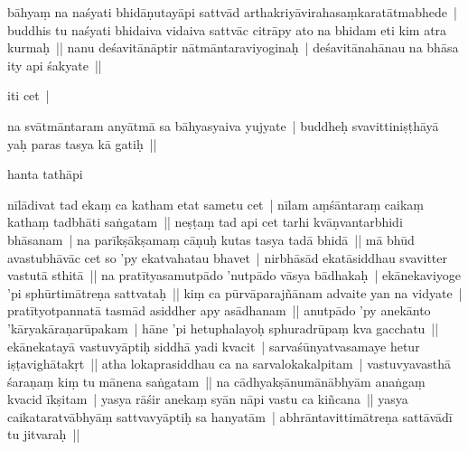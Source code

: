 \documentclass[article,12pt,a4paper]{memoir}%
\newcounter{parCount}
\begin{document}
	  \pstart \leavevmode%
	bāhyaṃ na naśyati bhidāṇutayāpi sattvād arthakriyāvirahasaṃkaratātmabhede | buddhis tu naśyati bhidaiva vidaiva sattvāc citrāpy ato na bhidam eti kim atra kurmaḥ ||  nanu deśavitānāptir nātmāntaraviyoginaḥ | deśavitānahānau na bhāsa ity api śakyate ||
	{}
	\pend%
      

	  \pstart \leavevmode%
	iti cet |
	{}
	\pend%
      

	  \pstart \leavevmode%
	na svātmāntaram anyātmā sa bāhyasyaiva yujyate | buddheḥ svavittiniṣṭhāyā yaḥ paras tasya kā gatiḥ || 
	{}
	\pend%
      

	  \pstart \leavevmode%
	hanta tathāpi
	{}
	\pend%
      

	  \pstart \leavevmode%
	nīlādivat tad ekaṃ ca katham etat sametu cet | nīlam aṃśāntaraṃ caikaṃ kathaṃ tadbhāti saṅgatam || neṣṭaṃ tad api cet tarhi kvāṇvantarbhidi bhāsanam | na parīkṣākṣamaṃ cāṇuḥ kutas tasya tadā bhidā || mā bhūd avastubhāvāc cet so 'py ekatvahatau bhavet | nirbhāsād ekatāsiddhau svavitter vastutā sthitā ||  na pratītyasamutpādo 'nutpādo vāsya bādhakaḥ | ekānekaviyoge 'pi sphūrtimātreṇa sattvataḥ || kiṃ ca pūrvāparajñānam advaite yan na vidyate | pratītyotpannatā tasmād asiddher apy asādhanam ||  anutpādo 'py anekānto 'kāryakāraṇarūpakam | hāne 'pi hetuphalayoḥ sphuradrūpaṃ kva gacchatu ||  ekānekatayā vastuvyāptiḥ siddhā yadi kvacit | sarvaśūnyatvasamaye hetur iṣṭavighātakṛt || atha lokaprasiddhau ca na sarvalokakalpitam | vastuvyavasthā śaraṇaṃ kiṃ tu mānena saṅgatam || na cādhyakṣānumānābhyām anaṅgaṃ kvacid īkṣitam | yasya rāśir anekaṃ syān nāpi vastu ca kiñcana ||  yasya caikataratvābhyāṃ sattvavyāptiḥ sa hanyatām | abhrāntavittimātreṇa sattāvādī tu jitvaraḥ || 
	{}
	\pend%
      
\end{document}
